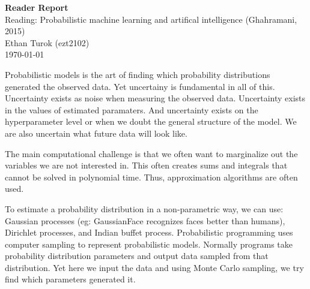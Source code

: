\documentclass[12pt]{article}
\begin{document}
\begin{flushleft}
\textbf{Reader Report} \\
Reading: Probabilistic machine learning and artifical intelligence (Ghahramani, 2015) \\
Ethan Turok (ezt2102) \\
\today
\end{flushleft}

\vspace{0.1in}

\normalsize

Probabilistic models is the art of finding which probability distributions generated the observed data. Yet uncertainy is fundamental in all of this. Uncertainty exists as noise when measuring the observed data. Uncertainty exists in the values of estimated paramaters. And uncertainty exists on the hyperparameter level or when we doubt the general structure of the model. We are also uncertain what future data will look like.

The main computational challenge is that we often want to marginalize out the variables we are not interested in. This often creates sums and integrals that cannot be solved in polynomial time. Thus, approximation algorithms are often used.

To estimate a probability distribution in a non-parametric way, we can use:
Gaussian processes (eg: GaussianFace recognizes faces better than humans),
Dirichlet processes, and Indian buffet process. Probabilistic programming uses
computer sampling to represent probabilistic models. Normally programs take
probability distribution parameters and output data sampled from that
distribution. Yet here we input the data and using Monte Carlo sampling, we try
find which parameters generated it.
\end{document}
